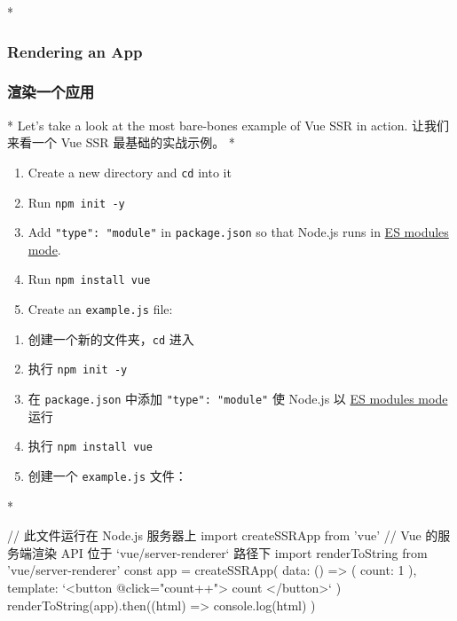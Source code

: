  
\begin{paracol}{2}
 
\switchcolumn[0]*%
\subsubsection{Rendering an App}
\switchcolumn
\subsubsection{渲染一个应用}
\switchcolumn[0]*%
Let's take a look at the most bare-bones example of Vue SSR in action.
\switchcolumn
让我们来看一个 Vue SSR 最基础的实战示例。
\switchcolumn[0]*%
\begin{enumerate}
\item
  Create a new directory and \texttt{cd} into it
\item
  Run \texttt{npm\ init\ -y}
\item
  Add \texttt{"type":\ "module"} in \texttt{package.json} so that
  Node.js runs in
  \href{https://nodejs.org/api/esm.html\#modules-ecmascript-modules}{ES
  modules mode}.
\item
  Run \texttt{npm\ install\ vue}
\item
  Create an \texttt{example.js} file:
\end{enumerate}
\switchcolumn
\begin{enumerate}
\item
  创建一个新的文件夹，\texttt{cd} 进入
\item
  执行 \texttt{npm\ init\ -y}
\item
  在 \texttt{package.json} 中添加 \texttt{"type":\ "module"} 使 Node.js
  以
  \href{https://nodejs.org/api/esm.html\#modules-ecmascript-modules}{ES
  modules mode} 运行
\item
  执行 \texttt{npm\ install\ vue}
\item
  创建一个 \texttt{example.js} 文件：
\end{enumerate}
\switchcolumn[0]*%
\begin{codeJs}
// 此文件运行在 Node.js 服务器上
import { createSSRApp } from 'vue'
// Vue 的服务端渲染 API 位于 `vue/server-renderer` 路径下
import { renderToString } from 'vue/server-renderer'
const app = createSSRApp({
  data: () => ({ count: 1 }),
  template: `<button @click="count++">{{ count }}</button>`
})
renderToString(app).then((html) => {
  console.log(html)
})
\end{codeJs}
\switchcolumn
\begin{codeJs}

\end{codeJs}
\end{paracol}
